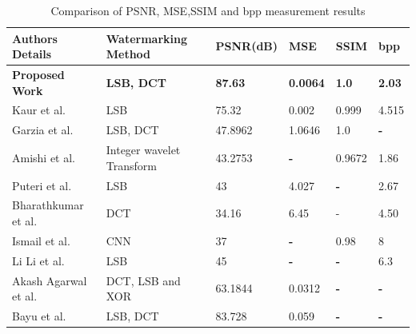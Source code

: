 \documentclass{ieeeaccess}
\begin{document}
\begin{table}[htbp]
  \centering
  \caption{Comparison of PSNR, MSE,SSIM and bpp measurement results}
  \label{watermarking_comparison}
  \begin{tabular}{|m{1.5cm}|m{1.6cm}|m{1.1cm}|m{0.6cm}|m{0.6cm}|m{0.5cm}|}
    \toprule\hline
    \textbf{Authors Details} & \textbf {Watermarking Method} & \textbf {PSNR(dB)} & \textbf{MSE} & \textbf {SSIM}& \textbf {bpp} \\\hline

   \textbf{Proposed Work} & \textbf{LSB, DCT} & \textbf{87.63} & \textbf{0.0064} & \textbf{1.0}
   & \textbf{2.03}\\\hline
    Kaur et al. \cite{b68} & LSB & 75.32 & 0.002 & 0.999 & 4.515\\\hline
    Garzia et al. \cite{b4} & LSB, DCT & 47.8962 & 1.0646 & 1.0 & \textbf{-}\\\hline
    Amishi et al. \cite{b69} & Integer wavelet Transform & 43.2753 &  \textbf{-} & 0.9672 & 1.86\\\hline
    Puteri et al. \cite{b73} & LSB & 43 &  4.027 & \textbf{-} & 2.67\\\hline

     Bharathkumar et al. \cite{b70} & DCT & 34.16 & 6.45 & $\textbf{-}$
    & 4.50\\\hline
    Ismail et al. \cite{b71} & CNN & 37 & \textbf{-} & 0.98
    & 8\\\hline
    Li Li et al. \cite{b72} & LSB &  45 & \textbf{-} & \textbf{-}
    & 6.3\\\hline
    Akash Agarwal et al. \cite{b63} & DCT, LSB and XOR & 63.1844 & 0.0312 & \textbf{-}
    & \textbf{-}\\\hline
    Bayu et al. \cite{b67} & LSB, DCT & 83.728 & 0.059 & \textbf{-}
    & \textbf{-}\\\hline
    \bottomrule
  \end{tabular}
\end{table}
\end{document}
